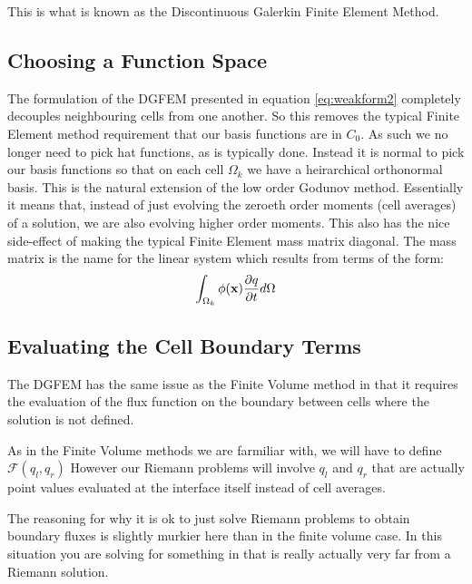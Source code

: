 \documentclass[10]{amsart}
\begin{document}
 This is what is known as the Discontinuous Galerkin Finite Element Method. 
 
 \subsection{Choosing a Function Space}
 The formulation of the DGFEM presented in equation \eqref{eq:weakform2} completely decouples neighbouring cells from one another.
 So this removes the typical Finite Element method requirement that our basis functions are in $C_0$. As such we no longer
 need to pick hat functions, as is typically done. Instead it is normal to pick our basis functions so that on each
 cell $\Omega_k$ we have a heirarchical orthonormal basis. This is the natural extension of the low order Godunov method.
 Essentially it means that, instead of just evolving the zeroeth order moments (cell averages) of a solution, we are also
 evolving higher order moments. This also has the nice side-effect of making the typical Finite Element mass matrix  
 diagonal. The mass matrix is the name for the linear system which results from terms of the form:
 $$\int_{\Omega_k} \phi({\bf x}) \frac{\partial q}{\partial t} d\Omega $$
 
 \subsection{Evaluating the Cell Boundary Terms}
 The DGFEM has the same issue as the Finite Volume method in that it requires the evaluation of the flux function
 on the boundary between cells where the solution is not defined. 
 
 As in the Finite Volume methods we are farmiliar with, we will have to define $\mathcal{F}(q_l,q_r)$
 However our Riemann problems will involve $q_l$ and $q_r$ that are actually
 point values evaluated at the interface itself instead of cell
 averages. 
 
 The reasoning for why it is ok to just solve Riemann problems to obtain boundary fluxes is slightly
 murkier here than in the finite volume case. In this situation you are solving for something 
 in that is really actually very far from a Riemann solution.
 
\end{document}
